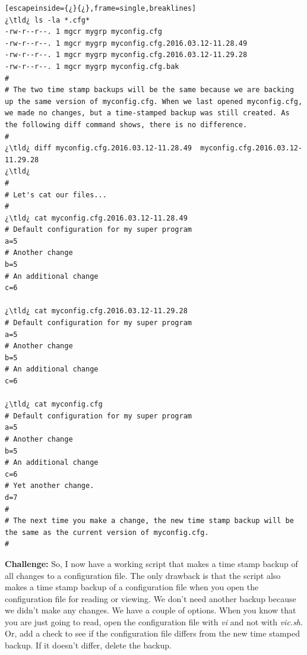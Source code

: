 \begin{lstlisting}[escapeinside={¿}{¿},frame=single,breaklines]
¿\tld¿ ls -la *.cfg*
-rw-r--r--. 1 mgcr mygrp myconfig.cfg
-rw-r--r--. 1 mgcr mygrp myconfig.cfg.2016.03.12-11.28.49
-rw-r--r--. 1 mgcr mygrp myconfig.cfg.2016.03.12-11.29.28
-rw-r--r--. 1 mgcr mygrp myconfig.cfg.bak
#
# The two time stamp backups will be the same because we are backing up the same version of myconfig.cfg. When we last opened myconfig.cfg, we made no changes, but a time-stamped backup was still created. As the following diff command shows, there is no difference.
#
¿\tld¿ diff myconfig.cfg.2016.03.12-11.28.49  myconfig.cfg.2016.03.12-11.29.28 
¿\tld¿
#
# Let's cat our files...
#
¿\tld¿ cat myconfig.cfg.2016.03.12-11.28.49
# Default configuration for my super program
a=5
# Another change
b=5
# An additional change
c=6

¿\tld¿ cat myconfig.cfg.2016.03.12-11.29.28 
# Default configuration for my super program
a=5
# Another change
b=5
# An additional change
c=6

¿\tld¿ cat myconfig.cfg
# Default configuration for my super program
a=5
# Another change
b=5
# An additional change
c=6
# Yet another change.
d=7
#
# The next time you make a change, the new time stamp backup will be the same as the current version of myconfig.cfg.
#
\end{lstlisting}

\textbf{\color{red}Challenge:}
So, I now have a working script that makes a time stamp backup of all changes to a configuration file. The only drawback is that the script also makes a time stamp backup of a configuration file when you open the configuration file for reading or viewing. We don't need another backup because we didn't make any changes. We have a couple of options. When you know that you are just going to read, open the configuration file with \emph{vi} and not with \emph{vic.sh}. Or, add a check to see if the configuration file differs from the new time stamped backup. If it doesn't differ, delete the backup. 

